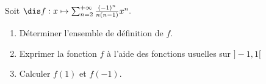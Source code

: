 \documentclass[a4paper,10pt]{report}
\begin{document}
%

\begin{Exercice}{} Soit $\dis f : x \mapsto \sum_{n = 2}^{ + \infty} \frac{( - 1)^{n}}{n(n - 1)}x^{n}.$

  \begin{enumerate}
  \item
    Déterminer l'ensemble de définition de $f$.
  \item
    Exprimer la fonction $f$ à l'aide des fonctions usuelles sur $] - 1,1[$
  \item Calculer $f(1)$ et $f( - 1)$.
  \end{enumerate}
  \end{Exercice} 
  
\end{document}
